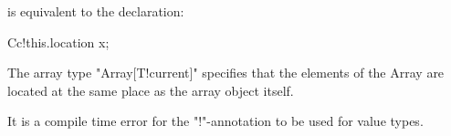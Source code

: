 \noindent
is equivalent to the declaration:
\begin{xten}
    C{c}!this.location x;
\end{xten}

\noindent
The array type \xcd"Array[T!current]"
specifies that the elements of the Array are located at the same
place as the array object itself.

\begin{staticrule*}
  It is a compile time error for the \xcd"!"-annotation to
  be used for value types.
\end{staticrule*}

